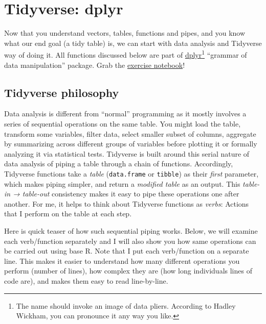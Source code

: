\documentclass[
]{book}
\begin{document}
\hypertarget{dplyr}{%
\chapter{Tidyverse: dplyr}\label{dplyr}}

Now that you understand vectors, tables, functions and pipes, and you know what our end goal (a tidy table) is, we can start with data analysis and Tidyverse way of doing it. All functions discussed below are part of \href{https://dplyr.tidyverse.org/}{dplyr}\footnote{The name should invoke an image of data pliers. According to Hadley Wickham, you can pronounce it any way you like.} ``grammar of data manipulation'' package. Grab the \href{notebooks/Seminar\%2006\%20-\%20dplyr.Rmd}{exercise notebook}!

\hypertarget{tidyverse-philosophy}{%
\section{Tidyverse philosophy}\label{tidyverse-philosophy}}

Data analysis is different from ``normal'' programming as it mostly involves a series of sequential operations on the same table. You might load the table, transform some variables, filter data, select smaller subset of columns, aggregate by summarizing across different groups of variables before plotting it or formally analyzing it via statistical tests. Tidyverse is built around this serial nature of data analysis of piping a table through a chain of functions. Accordingly, Tidyverse functions take a \emph{table} (\texttt{data.frame} or \texttt{tibble}) as their \emph{first} parameter, which makes piping simpler, and return a \emph{modified table} as an output. This \emph{table-in → table-out} consistency makes it easy to pipe these operations one after another. For me, it helps to think about Tidyverse functions as \emph{verbs}: Actions that I perform on the table at each step.

Here is quick teaser of how such sequential piping works. Below, we will examine each verb/function separately and I will also show you how same operations can be carried out using base R. Note that I put each verb/function on a separate line. This makes it easier to understand how many different operations you perform (number of lines), how complex they are (how long individuals lines of code are), and makes them easy to read line-by-line.
\end{document}
